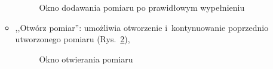 \begin{itemize}
\begin{itemize}
\begin{figure}[!htb]
\centering 		
  \hspace{2mm}
\caption{Okno dodawania pomiaru po prawidłowym wypełnieniu} 	
\label{newSurveyFilled}
\end{figure}

\item ,,Otwórz pomiar'': umożliwia otworzenie i~kontynuowanie poprzednio utworzonego pomiaru (Rys.~\ref{openSurvey}),

\begin{figure}[!htb]
\centering 		
  \hspace{2mm}
\caption{Okno otwierania pomiaru} 	
\label{openSurvey}
\end{figure}


\end{itemize}
\end{itemize}
